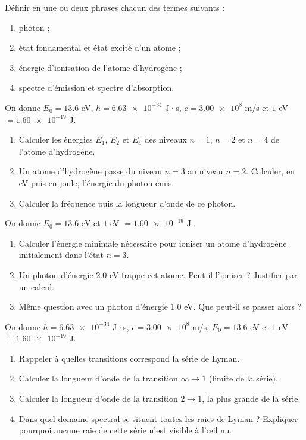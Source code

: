 \documentclass[11pt]{article}
\newcounter{popsec}
\newcounter{popsub}
\newcommand{\courssub}[1]{%
  \stepcounter{popsub}%
  \par\vspace{9pt}\noindent{\popxbold\fontsize{11.5}{13}\selectfont\color{popink}{\color{poporange}\thepopsec.\thepopsub}\hspace{6pt}#1}\par\nopagebreak\vspace{4pt}
}
\begin{document}
\begin{exercice}[Définitions]
Définir en une ou deux phrases chacun des termes suivants :
\begin{enumerate}
\item photon ;
\item état fondamental et état excité d'un atome ;
\item énergie d'ionisation de l'atome d'hydrogène ;
\item spectre d'émission et spectre d'absorption.
\end{enumerate}
\end{exercice}

\begin{exercice}
On donne $E_0 = \num{13,6}$ eV, $h = \num{6,63e-34}$ J·s, $c = \num{3,00e8}$ m/s et $\num{1}$ eV $= \num{1,60e-19}$ J.
\begin{enumerate}
\item Calculer les énergies $E_1$, $E_2$ et $E_4$ des niveaux $n = 1$, $n = 2$ et $n = 4$ de l'atome d'hydrogène.
\item Un atome d'hydrogène passe du niveau $n = 3$ au niveau $n = 2$. Calculer, en eV puis en joule, l'énergie du photon émis.
\item Calculer la fréquence puis la longueur d'onde de ce photon.
\end{enumerate}
\end{exercice}

\courssub{Je m'entraîne}

\begin{exercice}
On donne $E_0 = \num{13,6}$ eV et $\num{1}$ eV $= \num{1,60e-19}$ J.
\begin{enumerate}
\item Calculer l'énergie minimale nécessaire pour ioniser un atome d'hydrogène initialement dans l'état $n = 3$.
\item Un photon d'énergie \num{2,0} eV frappe cet atome. Peut-il l'ioniser ? Justifier par un calcul.
\item Même question avec un photon d'énergie \num{1,0} eV. Que peut-il se passer alors ?
\end{enumerate}
\end{exercice}

\begin{exercice}
On donne $h = \num{6,63e-34}$ J·s, $c = \num{3,00e8}$ m/s, $E_0 = \num{13,6}$ eV et $\num{1}$ eV $= \num{1,60e-19}$ J.
\begin{enumerate}
\item Rappeler à quelles transitions correspond la série de Lyman.
\item Calculer la longueur d'onde de la transition $\infty \rightarrow 1$ (limite de la série).
\item Calculer la longueur d'onde de la transition $2 \rightarrow 1$, la plus grande de la série.
\item Dans quel domaine spectral se situent toutes les raies de Lyman ? Expliquer pourquoi aucune raie de cette série n'est visible à l'œil nu.
\end{enumerate}
\end{exercice}
\end{document}
